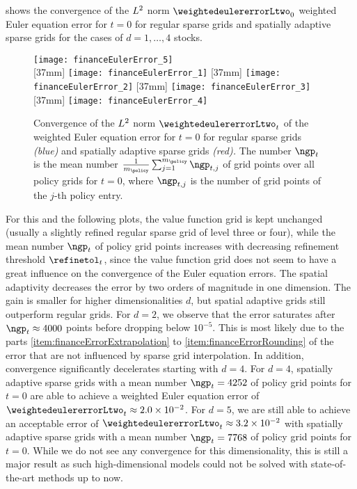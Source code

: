  shows the convergence of the
$L^2$ norm $\weightedeulererrorLtwo_0$
weighted Euler equation error for $t = 0$ for regular sparse grids
and spatially adaptive sparse grids
for the cases of $d = 1, \dotsc, 4$ stocks.
\begin{figure}
  \texttt{[image: financeEulerError\_5]}%
  \\[2mm]%
  [37mm]{%
    \texttt{[image: financeEulerError\_1]}%
  }%
  \hfill%
  [37mm]{%
    \texttt{[image: financeEulerError\_2]}%
  }%
  \hfill%
  [37mm]{%
    \texttt{[image: financeEulerError\_3]}%
  }%
  \hfill%
  [37mm]{%
    \texttt{[image: financeEulerError\_4]}%
  }%
  \caption[Convergence of the weighted Euler equation error]{%
    Convergence of the $L^2$ norm $\weightedeulererrorLtwo_t$
    of the weighted Euler equation error for $t = 0$ for
    regular sparse grids \emph{\textcolor{C0}{(blue)}} and
    spatially adaptive sparse grids \emph{\textcolor{C1}{(red)}.}
    The number $\ngp_t$ is the mean number
    $\frac{1}{m_{\policy}} \sum_{j=1}^{m_{\policy}} \ngp_{t,j}$
    of grid points over all policy grids for $t = 0$,
    where $\ngp_{t,j}$ is the number of grid points
    of the $j$-th policy entry.%
  }%
  \label{fig:financeEulerError}%
\end{figure}%
For this and the following plots,
the value function grid is kept unchanged
(usually a slightly refined regular sparse grid of level three or four),
while the mean number $\ngp_t$ of policy grid points increases
with decreasing refinement threshold $\refinetol_t$,
since the value function grid does not seem to have a great influence
on the convergence of the Euler equation errors.
The spatial adaptivity decreases the error by
two orders of magnitude in one dimension.
The gain is smaller for higher dimensionalities $d$,
but spatial adaptive grids still outperform regular grids.
For $d = 2$, we observe that the error saturates
after $\ngp_t \approx \num{4000}$ points before dropping below $10^{-5}$.
This is most likely due to the parts
\ref{item:financeErrorExtrapolation} to
\ref{item:financeErrorRounding} of the error that are not influenced
by sparse grid interpolation.
In addition, convergence significantly decelerates starting with $d = 4$.
For $d = 4$, spatially adaptive sparse grids with
a mean number $\ngp_t = \num{4252}$ of policy grid points for $t = 0$
are able to achieve a weighted Euler equation error of
$\weightedeulererrorLtwo_t \approx \num{2.0e-2}$.
For $d = 5$, we are still able to achieve an acceptable error of
$\weightedeulererrorLtwo_t \approx \num{3.2e-2}$
with spatially adaptive sparse grids with
a mean number $\ngp_t = \num{7768}$ of policy grid points for $t = 0$.
While we do not see any convergence for this dimensionality,
this is still a major result as such high-dimensional models
could not be solved with state-of-the-art methods up to now.

